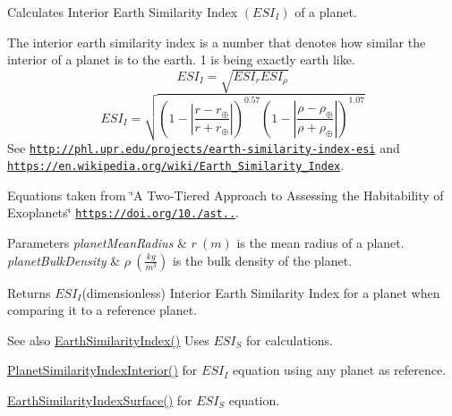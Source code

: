 Calculates Interior Earth Similarity Index $(ESI_I)$ of a planet. 

The interior earth similarity index is a number that denotes how similar the interior of a planet is to the earth. 1 is being exactly earth like. \[ESI_I=\sqrt{ESI_r ESI_\rho}\] \[ESI_I=\sqrt{\left ( 1 - \left | \frac{r-r_\oplus}{r+r_\oplus} \right | \right )^{0.57} \left ( 1 - \left | \frac{\rho-\rho_\oplus}{\rho+\rho_\oplus} \right | \right )^{1.07}}\] See \href{http://phl.upr.edu/projects/earth-similarity-index-esi}{\tt http\+://phl.\+upr.\+edu/projects/earth-\/similarity-\/index-\/esi} and \href{https://en.wikipedia.org/wiki/Earth_Similarity_Index}{\tt https\+://en.\+wikipedia.\+org/wiki/\+Earth\+\_\+\+Similarity\+\_\+\+Index}.

Equations taken from \char`\"{}\+A Two-\/\+Tiered Approach to Assessing the Habitability of Exoplanets\char`\"{} \href{https://doi.org/10.1089/ast.2010.0592}{\tt https\+://doi.\+org/10./ast..}.


\begin{DoxyParams}{Parameters}
{\em planet\+Mean\+Radius} & $r\ (m)$ is the mean radius of a planet. \\
\hline
{\em planet\+Bulk\+Density} & $\rho\ (\frac{kg}{m^3})$ is the bulk density of the planet. \\
\hline
\end{DoxyParams}
\begin{DoxyReturn}{Returns}
$ESI_I$(dimensionless) Interior Earth Similarity Index for a planet when comparing it to a reference planet. 
\end{DoxyReturn}
\begin{DoxySeeAlso}{See also}
\mbox{\hyperlink{group___astrophysics_ga4b86397b1c839c49ac599d49fda207d4}{Earth\+Similarity\+Index()}} Uses $ESI_S$ for calculations. 

\mbox{\hyperlink{group___astrophysics_ga6dc06a1a8baf6e132abed51fcf410c7f}{Planet\+Similarity\+Index\+Interior()}} for $ESI_I$ equation using any planet as reference. 

\mbox{\hyperlink{group___astrophysics_ga1df772b0ed354ca7f7e4a7a4af072325}{Earth\+Similarity\+Index\+Surface()}} for $ESI_S$ equation. 
\end{DoxySeeAlso}
\mbox{\label{group___astrophysics_ga1df772b0ed354ca7f7e4a7a4af072325}} 
